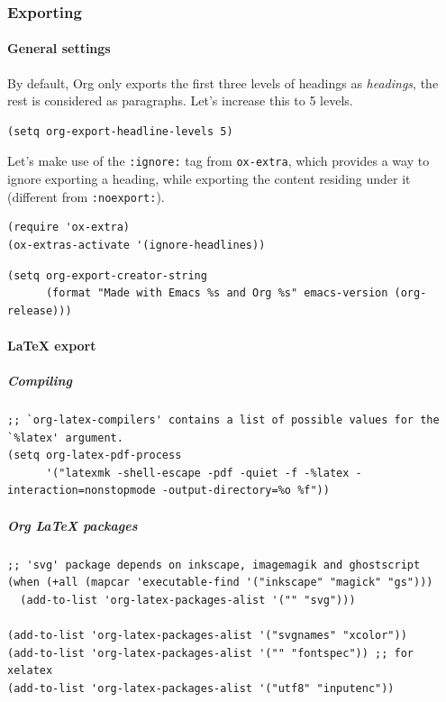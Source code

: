 \documentclass[11pt]{article}
\begin{document}
\subsubsection{Exporting}
\label{sec:org4855176}
\paragraph{General settings}
\label{sec:orge9627a1}
By default, Org only exports the first three levels of headings as \emph{headings}, the
rest is considered as paragraphs. Let's increase this to 5 levels.

\begin{verbatim}
(setq org-export-headline-levels 5)
\end{verbatim}

Let's make use of the \texttt{:ignore:} tag from \texttt{ox-extra}, which provides a way to ignore
exporting a heading, while exporting the content residing under it (different
from \texttt{:noexport:}).

\begin{verbatim}
(require 'ox-extra)
(ox-extras-activate '(ignore-headlines))
\end{verbatim}

\begin{verbatim}
(setq org-export-creator-string
      (format "Made with Emacs %s and Org %s" emacs-version (org-release)))
\end{verbatim}

\paragraph{\LaTeX{} export}
\label{sec:orgf4b9d5a}
\subparagraph{Compiling}
\label{sec:orgb205207}

\begin{verbatim}
;; `org-latex-compilers' contains a list of possible values for the `%latex' argument.
(setq org-latex-pdf-process
      '("latexmk -shell-escape -pdf -quiet -f -%latex -interaction=nonstopmode -output-directory=%o %f"))
\end{verbatim}

\subparagraph{Org \LaTeX{} packages}
\label{sec:org552ff4f}

\begin{verbatim}
;; 'svg' package depends on inkscape, imagemagik and ghostscript
(when (+all (mapcar 'executable-find '("inkscape" "magick" "gs")))
  (add-to-list 'org-latex-packages-alist '("" "svg")))

(add-to-list 'org-latex-packages-alist '("svgnames" "xcolor"))
(add-to-list 'org-latex-packages-alist '("" "fontspec")) ;; for xelatex
(add-to-list 'org-latex-packages-alist '("utf8" "inputenc"))
\end{verbatim}
\end{document}
